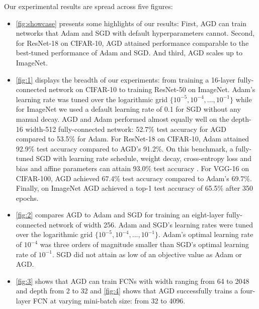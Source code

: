 Our experimental results are spread across five figures:
\begin{itemize}[leftmargin=*]
    \item \cref{fig:showcase} presents some highlights of our results: First, AGD can train networks that Adam and SGD with default hyperparameters cannot. Second, for ResNet-18 on CIFAR-10, AGD attained performance comparable to the best-tuned performance of Adam and SGD. And third, AGD scales up to ImageNet.
    \item \cref{fig:1} displays the breadth of our experiments: from training a 16-layer fully-connected network on CIFAR-10 to training ResNet-50 on ImageNet. Adam's learning rate was tuned over the logarithmic grid $\{10^{-5},10^{-4},...,10^{-1}\}$ while for ImageNet we used a default learning rate of 0.1 for SGD without any manual decay. AGD and Adam performed almost equally well on the depth-16 width-512 fully-connected network: 52.7\% test accuracy for AGD compared to 53.5\% for Adam.
    For ResNet-18 on CIFAR-10, Adam attained  92.9\% test accuracy compared to AGD's 91.2\%. On this benchmark, a fully-tuned SGD with learning rate schedule, weight decay, cross-entropy loss and bias and affine parameters can attain 93.0\% test accuracy \citep{kuangliu}. For VGG-16 on CIFAR-100, AGD achieved 67.4\% test accuracy compared to Adam's 69.7\%.
    Finally, on ImageNet AGD achieved a top-1 test accuracy of 65.5\% after 350 epochs.
    \item \cref{fig:2} compares AGD to Adam and SGD for training an eight-layer fully-connected network of width 256. Adam and SGD's learning rates were tuned over the logarithmic grid $\{10^{-5},10^{-4},...,10^{-1}\}$. Adam's optimal learning rate of $10^{-4}$ was three orders of magnitude smaller than SGD's optimal learning rate of $10^{-1}$. SGD did not attain as low of an objective value as Adam or AGD.
    \item \cref{fig:3} shows that AGD can train FCNs with width ranging from 64 to 2048 and depth from 2 to 32 and \cref{fig:4} shows that AGD successfully trains a four-layer FCN at varying mini-batch size: from 32 to 4096.
\end{itemize}




